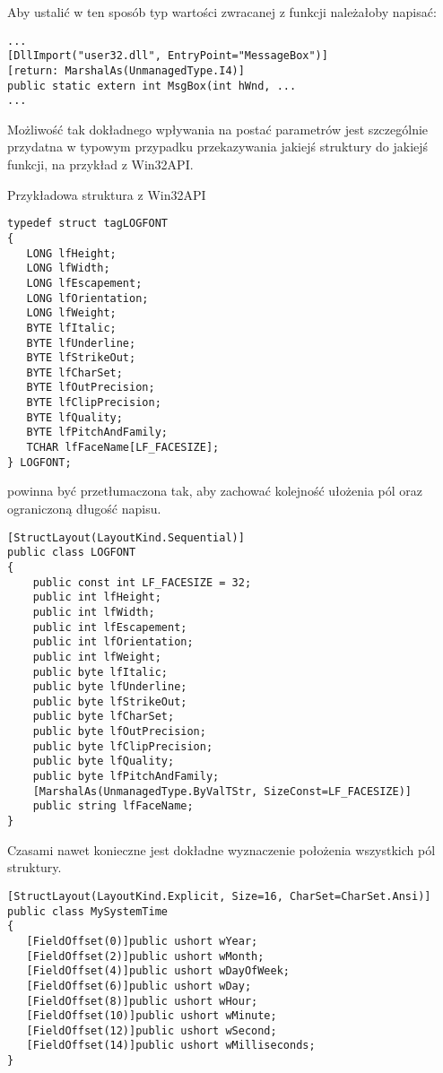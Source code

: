 Aby ustalić w ten sposób typ wartości zwracanej z funkcji należałoby napisać:

\begin{scriptsize}
\begin{verbatim}
...
[DllImport("user32.dll", EntryPoint="MessageBox")]
[return: MarshalAs(UnmanagedType.I4)]
public static extern int MsgBox(int hWnd, ...
...
\end{verbatim}
\end{scriptsize}

Możliwość tak dokładnego wpływania na postać parametrów jest szczególnie przydatna w typowym
przypadku przekazywania jakiejś struktury do jakiejś funkcji, na przykład z Win32API.

Przykładowa struktura z Win32API

\begin{scriptsize}
\begin{verbatim}
typedef struct tagLOGFONT 
{ 
   LONG lfHeight; 
   LONG lfWidth; 
   LONG lfEscapement; 
   LONG lfOrientation; 
   LONG lfWeight; 
   BYTE lfItalic; 
   BYTE lfUnderline; 
   BYTE lfStrikeOut; 
   BYTE lfCharSet; 
   BYTE lfOutPrecision; 
   BYTE lfClipPrecision; 
   BYTE lfQuality; 
   BYTE lfPitchAndFamily; 
   TCHAR lfFaceName[LF_FACESIZE]; 
} LOGFONT; 
\end{verbatim}
\end{scriptsize}

powinna być przetłumaczona tak, aby zachować kolejność ułożenia pól oraz ograniczoną długość napisu.

\begin{scriptsize}
\begin{verbatim}
[StructLayout(LayoutKind.Sequential)]
public class LOGFONT 
{ 
    public const int LF_FACESIZE = 32;
    public int lfHeight; 
    public int lfWidth; 
    public int lfEscapement; 
    public int lfOrientation; 
    public int lfWeight; 
    public byte lfItalic; 
    public byte lfUnderline; 
    public byte lfStrikeOut; 
    public byte lfCharSet; 
    public byte lfOutPrecision; 
    public byte lfClipPrecision; 
    public byte lfQuality; 
    public byte lfPitchAndFamily;
    [MarshalAs(UnmanagedType.ByValTStr, SizeConst=LF_FACESIZE)]
    public string lfFaceName; 
}
\end{verbatim}
\end{scriptsize}

Czasami nawet konieczne jest dokładne wyznaczenie położenia wszystkich pól
struktury.

\begin{scriptsize}
\begin{verbatim}
[StructLayout(LayoutKind.Explicit, Size=16, CharSet=CharSet.Ansi)]
public class MySystemTime 
{
   [FieldOffset(0)]public ushort wYear; 
   [FieldOffset(2)]public ushort wMonth;
   [FieldOffset(4)]public ushort wDayOfWeek; 
   [FieldOffset(6)]public ushort wDay; 
   [FieldOffset(8)]public ushort wHour; 
   [FieldOffset(10)]public ushort wMinute; 
   [FieldOffset(12)]public ushort wSecond; 
   [FieldOffset(14)]public ushort wMilliseconds; 
}
\end{verbatim}
\end{scriptsize}

